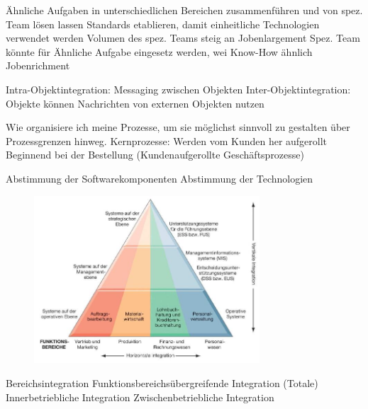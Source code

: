 \documentclass[ngerman,a4paper,12pt]{scrreprt}
\begin{document}
\ul
	\li Ähnliche Aufgaben in unterschiedlichen Bereichen zusammenführen und von spez. Team lösen lassen
	\li Standards etablieren, damit einheitliche Technologien verwendet werden
	Volumen des spez. Teams steig an \ra Jobenlargement
	\li Spez. Team könnte für Ähnliche Aufgabe eingesetz werden, wei Know-How ähnlich \ra Jobenrichment
\ulE

\ul
	\li Intra-Objektintegration: Messaging zwischen Objekten
	\li Inter-Objektintegration: Objekte können Nachrichten von externen Objekten nutzen
\ulE

\ul
	\li Wie organisiere ich meine Prozesse, um sie möglichst sinnvoll zu gestalten über Prozessgrenzen hinweg.
	\li Kernprozesse: Werden vom Kunden her aufgerollt \ra Beginnend bei der Bestellung (Kundenaufgerollte Geschäftsprozesse)
\ulE



\ul
	\li Abstimmung der Softwarekomponenten
	\li Abstimmung der Technologien
\ulE


\begin{figure}[H]
	\centering
	\includegraphics[width=0.75\textwidth]{img/V8.3.jpg}
	\caption{}
	\label{}
\end{figure}



\ul
	\li Bereichsintegration
	\li Funktionsbereichsübergreifende Integration
	\li (Totale) Innerbetriebliche Integration
	\li Zwischenbetriebliche Integration
\ulE
\end{document}
